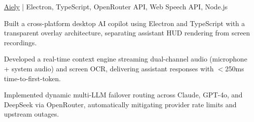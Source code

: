 \begin{cvproject}{\href{https://github.com/grvsnh/aiely}{\uline{Aiely}} | Electron, TypeScript, OpenRouter API, Web Speech API, Node.js}{}
    \item Built a cross-platform desktop AI copilot using Electron and TypeScript with a transparent overlay architecture, separating assistant HUD rendering from screen recordings.
    \item Developed a real-time context engine streaming dual-channel audio (microphone + system audio) and screen OCR, delivering assistant responses with $<$250ms time-to-first-token.
    \item Implemented dynamic multi-LLM failover routing across Claude, GPT-4o, and DeepSeek via OpenRouter, automatically mitigating provider rate limits and upstream outages.
\end{cvproject}